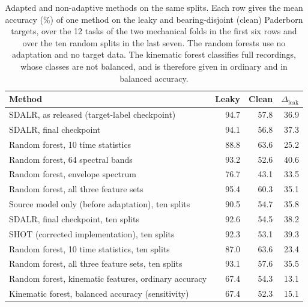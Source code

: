 \begin{table}[htbp]
\centering
\begingroup
\begin{tabular}{lrrr}
\toprule
Method & Leaky & Clean & $\Delta_{\mathrm{leak}}$ \\
\midrule
SDALR, as released (target-label checkpoint) & 94.7 & 57.8 & 36.9 \\
SDALR, final checkpoint & 94.1 & 56.8 & 37.3 \\
\midrule
Random forest, 10 time statistics & 88.8 & 63.6 & 25.2 \\
Random forest, 64 spectral bands & 93.2 & 52.6 & 40.6 \\
Random forest, envelope spectrum & 76.7 & 43.1 & 33.5 \\
Random forest, all three feature sets & 95.4 & 60.3 & 35.1 \\
\midrule
Source model only (before adaptation), ten splits & 90.5 & 54.7 & 35.8 \\
SDALR, final checkpoint, ten splits & 92.6 & 54.5 & 38.2 \\
SHOT (corrected implementation), ten splits & 92.3 & 53.1 & 39.3 \\
Random forest, 10 time statistics, ten splits & 87.0 & 63.6 & 23.4 \\
Random forest, all three feature sets, ten splits & 93.1 & 57.6 & 35.5 \\
Random forest, kinematic features, ordinary accuracy & 67.4 & 54.3 & 13.1 \\
Kinematic forest, balanced accuracy (sensitivity) & 67.4 & 52.3 & 15.1 \\
\bottomrule
\end{tabular}\par
\endgroup
\caption{Adapted and non-adaptive methods on the same splits. Each row gives the mean accuracy (\%) of one method on the leaky and bearing-disjoint (clean) Paderborn targets, over the 12 tasks of the two mechanical folds in the first six rows and over the ten random splits in the last seven. The random forests use no adaptation and no target data. The kinematic forest classifies full recordings, whose classes are not balanced, and is therefore given in ordinary and in balanced accuracy.}
\label{tab:methods}
\end{table}
